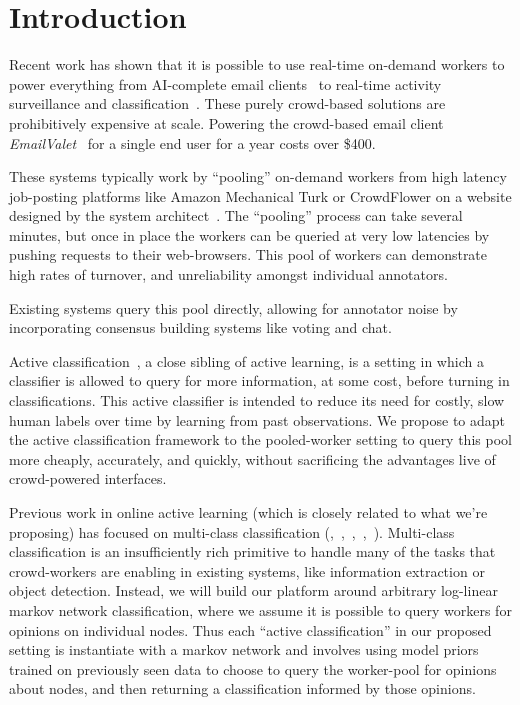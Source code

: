 \section{Introduction}

Recent work has shown that it is possible to use real-time on-demand workers to power everything from AI-complete email clients~\cite{kokkalis2013emailvalet} to real-time activity surveillance and classification~\cite{lasecki2013real}.
These purely crowd-based solutions are prohibitively expensive at scale.
Powering the crowd-based email client \textit{EmailValet}~\cite{kokkalis2013emailvalet} for a single end user for a year costs over \$400.

These systems typically work by ``pooling'' on-demand workers from high latency job-posting platforms like Amazon Mechanical Turk or CrowdFlower on a website designed by the system architect~\cite{lasecki2011real}.
 The ``pooling'' process can take several minutes, but once in place the workers can be queried at very low latencies by pushing requests to their web-browsers.
 This pool of workers can demonstrate high rates of turnover, and unreliability amongst individual annotators.

Existing systems query this pool directly, allowing for annotator noise by incorporating consensus building systems like voting and chat.


Active classification~\cite{greiner2002learning}, a close sibling of active learning, is a setting in which a classifier is allowed to query for more information, at some cost, before turning in classifications.
 This active classifier is intended to reduce its need for costly, slow human labels over time by learning from past observations.
 We propose to adapt the active classification framework to the pooled-worker setting to query this pool more cheaply, accurately, and quickly, without sacrificing the advantages live of crowd-powered interfaces.

Previous work in online active learning (which is closely related to what we're proposing) has focused on multi-class classification (\cite{chu2011unbiased},~\cite{agarwal2013selective},~\cite{cheng2013feedback},~\cite{vzliobaite2011active},~\cite{helmbold1997some}).
 Multi-class classification is an insufficiently rich primitive to handle many of the tasks that crowd-workers are enabling in existing systems, like information extraction or object detection.
 Instead, we will build our platform around arbitrary log-linear markov network classification, where we assume it is possible to query workers for opinions on individual nodes.
 Thus each ``active classification'' in our proposed setting is instantiate with a markov network and involves using model priors trained on previously seen data to choose to query the worker-pool for opinions about nodes, and then returning a classification informed by those opinions.


